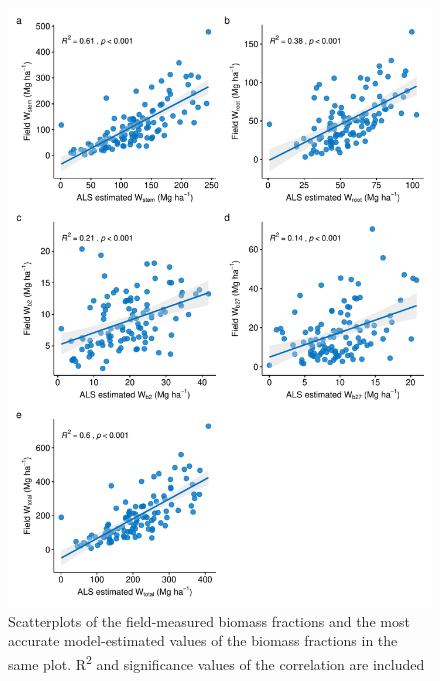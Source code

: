 \begin{figure}
    \centering
    \includegraphics[width=\textwidth]{img/carbon/carbon-compara-lidar-field.pdf}\caption{Scatterplots of the field-measured biomass fractions and the most accurate model-estimated values of the biomass fractions in the same plot. R\textsuperscript{2} and significance values of the correlation are included}\label{fig:carbon:compara}
\end{figure}


